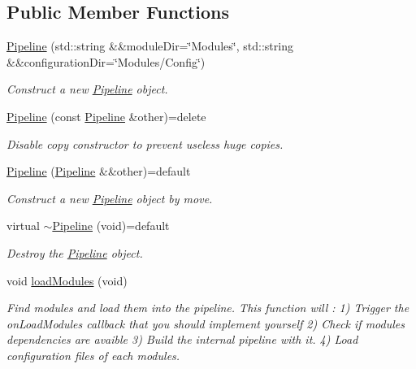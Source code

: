 \subsection*{Public Member Functions}
\begin{DoxyCompactItemize}
\item 
\mbox{\hyperlink{classo_z_1_1_pipeline_a5fc2efefb6e953ce5a4f8d7d3437619a}{Pipeline}} (std\+::string \&\&module\+Dir=\char`\"{}Modules\char`\"{}, std\+::string \&\&configuration\+Dir=\char`\"{}Modules/Config\char`\"{})
\begin{DoxyCompactList}\small\item\em Construct a new \mbox{\hyperlink{classo_z_1_1_pipeline}{Pipeline}} object. \end{DoxyCompactList}\item 
\mbox{\hyperlink{classo_z_1_1_pipeline_ab1d6cd9a6b71cae2b5ebe0031b945237}{Pipeline}} (const \mbox{\hyperlink{classo_z_1_1_pipeline}{Pipeline}} \&other)=delete
\begin{DoxyCompactList}\small\item\em Disable copy constructor to prevent useless huge copies. \end{DoxyCompactList}\item 
\mbox{\hyperlink{classo_z_1_1_pipeline_a6f9e61063bafb53108f1058f3de8c56a}{Pipeline}} (\mbox{\hyperlink{classo_z_1_1_pipeline}{Pipeline}} \&\&other)=default
\begin{DoxyCompactList}\small\item\em Construct a new \mbox{\hyperlink{classo_z_1_1_pipeline}{Pipeline}} object by move. \end{DoxyCompactList}\item 
virtual \mbox{\hyperlink{classo_z_1_1_pipeline_a91969687e5d9dccb384febbce62d5dd9}{$\sim$\+Pipeline}} (void)=default
\begin{DoxyCompactList}\small\item\em Destroy the \mbox{\hyperlink{classo_z_1_1_pipeline}{Pipeline}} object. \end{DoxyCompactList}\item 
void \mbox{\hyperlink{classo_z_1_1_pipeline_a2815743412c13100c68fee0d87283417}{load\+Modules}} (void)
\begin{DoxyCompactList}\small\item\em Find modules and load them into the pipeline. This function will \+: 1) Trigger the on\+Load\+Modules callback that you should implement yourself 2) Check if modules dependencies are avaible 3) Build the internal pipeline with it. 4) Load configuration files of each modules. \end{DoxyCompactList}\item 

\end{DoxyCompactItemize}
